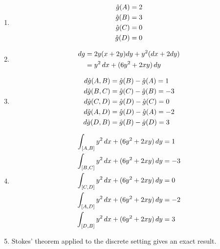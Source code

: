 \documentclass{article}
\begin{document}
\begin{enumerate}[label=(\alph*)]
    \item 
    \begin{align}
        \hat{g}(A) &= 2 \notag\\
        \hat{g}(B) &= 3 \notag\\
        \hat{g}(C) &= 0 \notag\\
        \hat{g}(D) &= 0 \notag
    \end{align}

    \item
    \begin{align}
        dg  &= 2y(x + 2y)dy + y^2(dx + 2dy) \notag\\
            &= y^2 \, dx + (6y^2 + 2xy) \, dy \notag
    \end{align}

    \item 
    \begin{align}
        d\hat{g}(A, B) &= \hat{g}(B) - \hat{g}(A) =  1  \notag\\
        d\hat{g}(B, C) &= \hat{g}(C) - \hat{g}(B) =  -3 \notag\\
        d\hat{g}(C, D) &= \hat{g}(D) - \hat{g}(C) =  0  \notag\\
        d\hat{g}(A, D) &= \hat{g}(D) - \hat{g}(A) =  -2 \notag\\
        d\hat{g}(D, B) &= \hat{g}(B) - \hat{g}(D) =  3  \notag
    \end{align}

    \item
    \begin{align}
        \int_{[A,B]} y^2 \, dx + (6y^2 + 2xy) \, dy &= 1  \notag\\
        \int_{[B,C]} y^2 \, dx + (6y^2 + 2xy) \, dy &= -3 \notag\\
        \int_{[C,D]} y^2 \, dx + (6y^2 + 2xy) \, dy &= 0  \notag\\
        \int_{[A,D]} y^2 \, dx + (6y^2 + 2xy) \, dy &= -2 \notag\\
        \int_{[D,B]} y^2 \, dx + (6y^2 + 2xy) \, dy &= 3  \notag
    \end{align}

    \item
    Stokes' theorem applied to the discrete setting gives an exact result.
\end{enumerate}


\vspace{1.8cm}
\\\\
\end{document}
